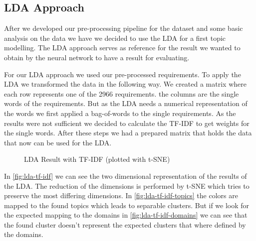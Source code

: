 \subsection{LDA Approach} %
\label{sub:own_lda}

After we developed our pre-processing pipeline for the dataset and some basic analysis on the data we have we decided to use the LDA for a first topic modelling. The LDA approach serves as reference for the result we wanted to obtain by the neural network to have a result for evaluating.


For our LDA approach we used our pre-processed requirements. To apply the LDA we transformed the data in the following way. We created a matrix where each row represents one of the 2966 requirements. the columns are the single words of the requirements. But as the LDA needs a numerical representation of the words we first applied a bag-of-words to the single requirements. As the results were not sufficient we decided to calculate the TF-IDF to get weights for the single words. After these steps we had a prepared matrix that holds the data that now can be used for the LDA.

\begin{figure}[bht]
    \caption{LDA Result with TF-IDF (plotted with t-SNE)} \label{fig:lda-tf-idf}
\end{figure}
\FloatBarrier

In \autoref{fig:lda-tf-idf} we can see the two dimensional representation of the results of the LDA. The reduction of the dimensions is performed by t-SNE which tries to preserve the most differing dimensions. In \autoref{fig:lda-tf-idf-topics} the colors are mapped to the found topics which leads to separable clusters. But if we look for the expected mapping to the domains in \autoref{fig:lda-tf-idf-domains} we can see that the found cluster doesn't represent the expected clusters that where defined by the domains.